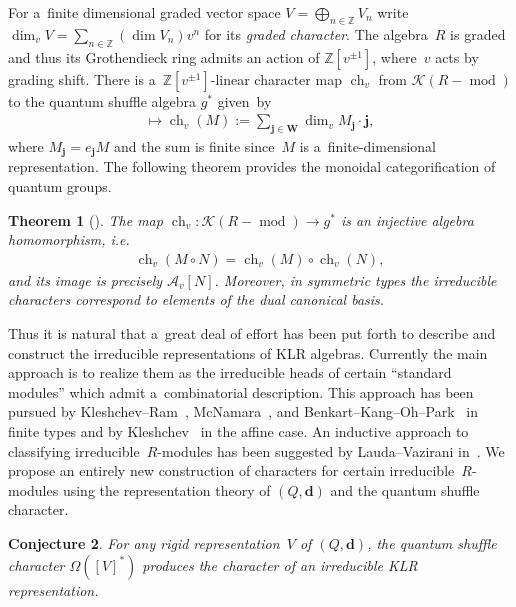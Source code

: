 \documentclass[pdftex]{sigma}
\numberwithin{equation}{section}
\newtheorem{Theorem}{Theorem}[section]
\newtheorem{Conjecture}[Theorem]{Conjecture}
\begin{document}
For a~f\/inite dimensional graded vector space $V=\bigoplus_{n\in\mathbb{Z}} V_n$ write $\operatorname{dim}_v
V=\sum\limits_{n\in\mathbb{Z}}(\operatorname{dim} V_n)v^n$ for its \emph{graded character}.
The algebra~$R$ is graded and thus its Grothendieck ring admits an action of $\mathbb{Z}[v^{\pm1}]$, where~$v$ acts by grading shift.
There is a~$\mathbb{Z}[v^{\pm1}]$-linear character map $\operatorname{ch}_v$ from $\mathcal{K}(R-\operatorname{mod})$ to
the quantum shuf\/f\/le algebra $g^*$ given~by
\begin{gather*}
[M]\mapsto \operatorname{ch}_v(M):=\sum\limits_{\mathbf{j}\in\mathbf{W}} \operatorname{dim}_v M_\mathbf{j}\cdot\mathbf{j},
\end{gather*}
where $M_\mathbf{j}=e_\mathbf{j} M$ and the sum is f\/inite since~$M$ is a~f\/inite-dimensional representation.
The following theorem provides the monoidal categorif\/ication of quantum groups.
\begin{Theorem}[\cite{khovanov-lauda2,rouquier2,varagnolo-vasserot}]%
The map $\operatorname{ch}_v: \mathcal{K}(R-\operatorname{mod})\to g^*$ is an injective algebra homomorphism, i.e.
\begin{gather*}
\operatorname{ch}_v(M\circ N)=\operatorname{ch}_v(M)\circ\operatorname{ch}_v(N),
\end{gather*}
and its image is precisely $\mathcal{A}_v[N]$.
Moreover, in symmetric types the irreducible characters correspond to elements of the dual canonical basis.
\end{Theorem}

Thus it is natural that a~great deal of ef\/fort has been put forth to describe and construct the irreducible
representations of KLR algebras.
Currently the main approach is to realize them as the irreducible heads of certain ``standard modules'' which admit
a~combinatorial description.
This approach has been pursued by Kleshchev--Ram~\cite{kleshchev-ram2}, McNamara~\cite{mcnamara}, and
Benkart--Kang--Oh--Park~\cite{benkart-kang-oh-park}
in f\/inite types and by Kleshchev~\cite{kleshchev} in the af\/f\/ine case.
An inductive approach to classifying irreducible~$R$-modules has been suggested by Lauda--Vazirani %
in~\cite{lauda-vazirani}.
We propose an entirely new construction of characters for certain irreducible~$R$-modules using the representation
theory of $(Q,\mathbf{d})$ and the quantum shuf\/f\/le character.

\begin{Conjecture}
\label{conj:rigid to irreducible}
For any rigid representation~$V$ of $(Q,\mathbf{d})$, the quantum shuffle character $\Omega([V]^*)$ produces the
character of an irreducible KLR representation.
\end{Conjecture}
\end{document}
